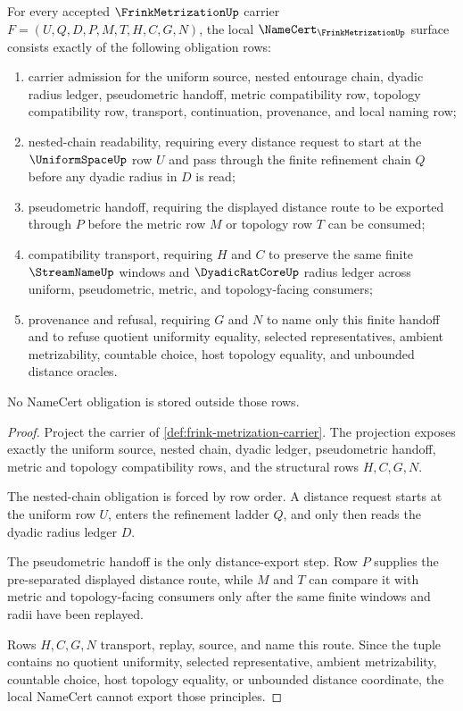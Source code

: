 \begin{theorem}
\label{thm:frink-metrization-namecert-obligations}
For every accepted $\FrinkMetrizationUp$ carrier $F=(U,Q,D,P,M,T,H,C,G,N)$, the local $\NameCert_{\FrinkMetrizationUp}$ surface consists exactly of the following obligation rows:
\begin{enumerate}
\item carrier admission for the uniform source, nested entourage chain, dyadic radius ledger, pseudometric handoff, metric compatibility row, topology compatibility row, transport, continuation, provenance, and local naming row;
\item nested-chain readability, requiring every distance request to start at the $\UniformSpaceUp$ row $U$ and pass through the finite refinement chain $Q$ before any dyadic radius in $D$ is read;
\item pseudometric handoff, requiring the displayed distance route to be exported through $P$ before the metric row $M$ or topology row $T$ can be consumed;
\item compatibility transport, requiring $H$ and $C$ to preserve the same finite $\StreamNameUp$ windows and $\DyadicRatCoreUp$ radius ledger across uniform, pseudometric, metric, and topology-facing consumers;
\item provenance and refusal, requiring $G$ and $N$ to name only this finite handoff and to refuse quotient uniformity equality, selected representatives, ambient metrizability, countable choice, host topology equality, and unbounded distance oracles.
\end{enumerate}
No NameCert obligation is stored outside those rows.
\end{theorem}
\begin{proof}
Project the carrier of \autoref{def:frink-metrization-carrier}. The projection exposes exactly the uniform source, nested chain, dyadic ledger, pseudometric handoff, metric and topology compatibility rows, and the structural rows $H,C,G,N$.

The nested-chain obligation is forced by row order. A distance request starts at the uniform row $U$, enters the refinement ladder $Q$, and only then reads the dyadic radius ledger $D$.

The pseudometric handoff is the only distance-export step. Row $P$ supplies the pre-separated displayed distance route, while $M$ and $T$ can compare it with metric and topology-facing consumers only after the same finite windows and radii have been replayed.

Rows $H,C,G,N$ transport, replay, source, and name this route. Since the tuple contains no quotient uniformity, selected representative, ambient metrizability, countable choice, host topology equality, or unbounded distance coordinate, the local NameCert cannot export those principles.
\end{proof}

